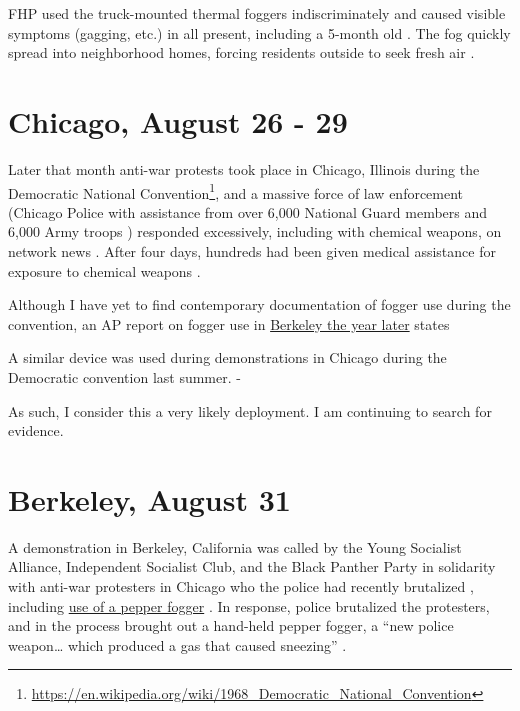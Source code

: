 \documentclass[
  11pt,
]{krantz}
\renewenvironment{quote}{\begin{VF}}{\end{VF}}
\renewcommand{\href}[2]{#2\footnote{\url{#1}}}
\begin{document}
FHP used the truck-mounted thermal foggers indiscriminately and caused visible symptoms (gagging, etc.) in all present, including a 5-month old \citep{McArdle2018}.
The fog quickly spread into neighborhood homes, forcing residents outside to seek fresh air \citep{Tschenschlok1995}.

\hypertarget{ChicagoIL1968_08_26}{%
\section*{Chicago, August 26 - 29}\label{ChicagoIL1968_08_26}}


Later that month anti-war protests took place in Chicago, Illinois during the \href{https://en.wikipedia.org/wiki/1968_Democratic_National_Convention}{Democratic National Convention}, and a massive force of law enforcement (Chicago Police with assistance from over 6,000 National Guard members and 6,000 Army troops \citep{TaylorandMorris2018}) responded excessively, including with chemical weapons, on network news \citep{Schultz1969, Karnow1983, Farber1988, Langguth2000}.
After four days, hundreds had been given medical assistance for exposure to chemical weapons \citep{TaylorandMorris2018}.

Although I have yet to find contemporary documentation of fogger use during the convention, an AP report on fogger use in \protect\hyperlink{BerkeleyCA1969_02_21}{Berkeley the year later} states

\begin{quote}
A similar device was used during demonstrations in Chicago during the Democratic convention last summer. - \citet{TheDailyTribune1969_02_21}
\end{quote}

As such, I consider this a very likely deployment.
I am continuing to search for evidence.

\hypertarget{BerkeleyCA1968_08_31}{%
\section*{Berkeley, August 31}\label{BerkeleyCA1968_08_31}}


A demonstration in Berkeley, California was called by the Young Socialist Alliance, Independent Socialist Club, and the Black Panther Party in solidarity with anti-war protesters in Chicago who the police had recently brutalized \citep{PatersonEveningNews1968_08_31, TheCapitalTimes1968_08_31}, including \protect\hyperlink{ChicagoIL1968_08_26}{use of a pepper fogger} \citep{TheDailyTribune1969_02_21}.
In response, police brutalized the protesters, and in the process brought out a hand-held pepper fogger, a ``new police weapon\ldots{} which produced a gas that caused sneezing'' \citep{PatersonEveningNews1968_08_31}.
\end{document}
